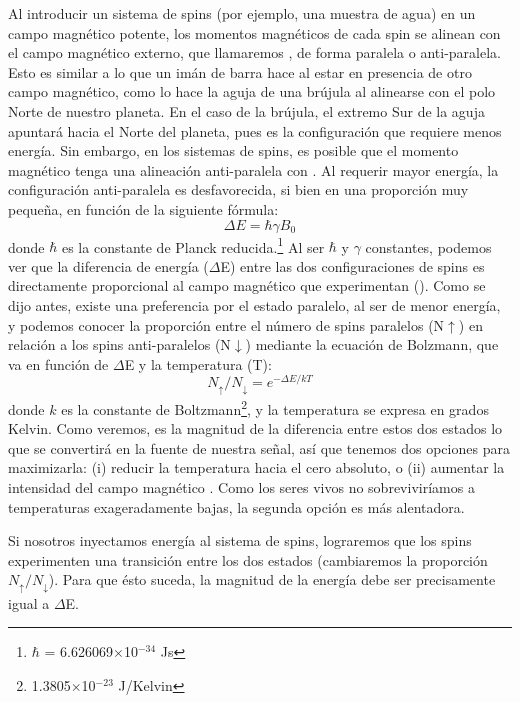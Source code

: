 Al introducir un sistema de spins (por ejemplo, una muestra de agua) en un campo magnético potente, los momentos magnéticos de cada spin se alinean con el campo magnético externo, que llamaremos \Bzero,  de forma paralela o anti-paralela. Esto es similar a lo que un imán de barra hace al estar en presencia de otro campo magnético, como lo hace la aguja de una brújula al alinearse con el polo Norte de nuestro planeta. En el caso de la brújula, el extremo Sur de la aguja apuntará hacia el Norte del planeta, pues es la configuración que requiere menos energía. Sin embargo, en los sistemas de spins, es posible que el momento magnético tenga una alineación anti-paralela con \Bzero. Al requerir mayor energía, la configuración anti-paralela es desfavorecida, si bien en una proporción muy pequeña, en función de la siguiente fórmula:
\begin{equation}
 \Delta E = \hbar \gamma B_0
\end{equation}
donde $\hbar$ es la constante de Planck reducida.\footnote{$\hbar$ = 6.626069$\times$10$^{-34}$ Js} Al ser $\hbar$ y $\gamma$ constantes, podemos ver que la diferencia de energía ($\Delta$E) entre las dos configuraciones de spins es directamente proporcional al campo magnético que experimentan (\Bzero). Como se dijo antes, existe una preferencia por el estado paralelo, al ser de menor energía, y podemos conocer la proporción entre el número de spins paralelos (N$\uparrow$) en relación a los spins anti-paralelos (N$\downarrow$) mediante la ecuación de Bolzmann, que va en función de $\Delta$E y la temperatura (T):
\begin{equation}
 \label{eq_Boltzmann}
 N_{\uparrow} / N_{\downarrow} = e^{-\Delta E / kT}
\end{equation}
donde $k$ es la constante de Boltzmann\footnote{1.3805$\times$10$^{-23}$ J/Kelvin}, y la temperatura se expresa en grados Kelvin. Como veremos, es la magnitud de la diferencia entre estos dos estados lo que se convertirá en la fuente de nuestra señal, así que tenemos dos opciones para maximizarla: (i) reducir la temperatura hacia el cero absoluto, o (ii) aumentar la intensidad del campo magnético \Bzero. Como los seres vivos no sobreviviríamos a temperaturas exageradamente bajas, la segunda opción es más alentadora.

Si nosotros inyectamos energía al sistema de spins, lograremos que los spins experimenten una transición entre los dos estados (cambiaremos la proporción $N_{\uparrow}/N_{\downarrow}$). Para que ésto suceda, la magnitud de la energía debe ser precisamente igual a $\Delta$E. 




